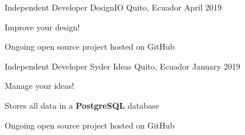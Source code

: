 
\begin{cventries}

  \cventry
    {Independent Developer}
    {DesignIO}
    {Quito, Ecuador}
    {April 2019}
    {
      \begin{cvitems}
        \item {Improve your design!}
        \item {Ongoing open source project hosted on GitHub}
      \end{cvitems} 
    }
    
  \cventry
    {Independent Developer}
    {Syder Ideas}
    {Quito, Ecuador}
    {January 2019}
    {
      \begin{cvitems}
        \item {Manage your ideas!}
        \item {Stores all data in a \textbf{PostgreSQL} database}
        \item {Ongoing open source project hosted on GitHub}
      \end{cvitems}
    }
        
\end{cventries}
